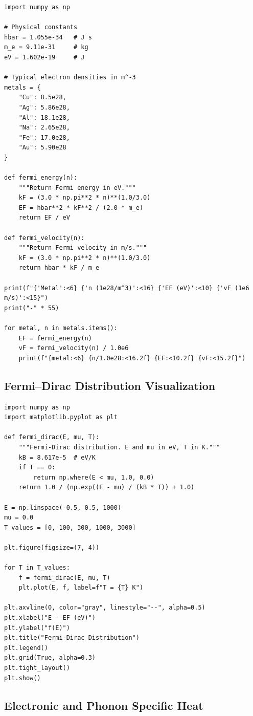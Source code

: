 \documentclass[11pt,a4paper]{article}
\begin{document}
\begin{lstlisting}
import numpy as np

# Physical constants
hbar = 1.055e-34   # J s
m_e = 9.11e-31     # kg
eV = 1.602e-19     # J

# Typical electron densities in m^-3
metals = {
    "Cu": 8.5e28,
    "Ag": 5.86e28,
    "Al": 18.1e28,
    "Na": 2.65e28,
    "Fe": 17.0e28,
    "Au": 5.90e28
}

def fermi_energy(n):
    """Return Fermi energy in eV."""
    kF = (3.0 * np.pi**2 * n)**(1.0/3.0)
    EF = hbar**2 * kF**2 / (2.0 * m_e)
    return EF / eV

def fermi_velocity(n):
    """Return Fermi velocity in m/s."""
    kF = (3.0 * np.pi**2 * n)**(1.0/3.0)
    return hbar * kF / m_e

print(f"{'Metal':<6} {'n (1e28/m^3)':<16} {'EF (eV)':<10} {'vF (1e6 m/s)':<15}")
print("-" * 55)

for metal, n in metals.items():
    EF = fermi_energy(n)
    vF = fermi_velocity(n) / 1.0e6
    print(f"{metal:<6} {n/1.0e28:<16.2f} {EF:<10.2f} {vF:<15.2f}")
\end{lstlisting}

\subsection{Fermi--Dirac Distribution Visualization}

\begin{lstlisting}
import numpy as np
import matplotlib.pyplot as plt

def fermi_dirac(E, mu, T):
    """Fermi-Dirac distribution. E and mu in eV, T in K."""
    kB = 8.617e-5  # eV/K
    if T == 0:
        return np.where(E < mu, 1.0, 0.0)
    return 1.0 / (np.exp((E - mu) / (kB * T)) + 1.0)

E = np.linspace(-0.5, 0.5, 1000)
mu = 0.0
T_values = [0, 100, 300, 1000, 3000]

plt.figure(figsize=(7, 4))

for T in T_values:
    f = fermi_dirac(E, mu, T)
    plt.plot(E, f, label=f"T = {T} K")

plt.axvline(0, color="gray", linestyle="--", alpha=0.5)
plt.xlabel("E - EF (eV)")
plt.ylabel("f(E)")
plt.title("Fermi-Dirac Distribution")
plt.legend()
plt.grid(True, alpha=0.3)
plt.tight_layout()
plt.show()
\end{lstlisting}

\subsection{Electronic and Phonon Specific Heat}
\end{document}
